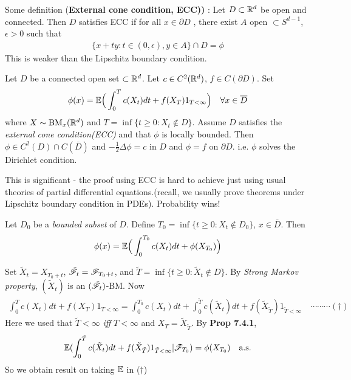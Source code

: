 \documentclass[12pt,a4paper]{report}
\newenvironment{proof}
{\begin{changemargin}{1cm}{0.5cm} 
	}%
	{\end{changemargin}
}
\begin{document}
Some definition (\textbf{External cone condition, ECC))} : Let $D \subset \mathbb{R}^d$ be open and connected. Then $D$ satisfies ECC if for all $x\in \partial D$ , there exist $A$ open $\subset S^{d-1}$, $\epsilon >0$ such that
\begin{align*}
\{x+ty : t\in (0,\epsilon), y\in A \} \cap D = \phi
\end{align*}
This is weaker than the Lipschitz boundary condition.

\s
{} Let $D$ be a connected open set $\subset \mathbb{R}^d$. Let $c\in C^2(\mathbb{R}^d)$, $f\in C(\partial D)$. Set
\begin{align*}
\phi(x) = \mathbb{E} \Big( \int_0^T c(X_t) dt + f(X_T) 1_{T<\infty} \Big) \quad \forall x\in \overline{D}
\end{align*}
where $X \sim \text{BM}_x(\mathbb{R}^d)$ and $T = \inf \{ t\geq 0: X_t \not\in D \}$. Assume $D$ satisfies the \emph{external cone condition(ECC)} and that $\phi$ is locally bounded. Then $\phi \in C^2(D) \cap C(\overline{D})$ and $-\frac{1}{2}\Delta \phi =c$ in $D$ and $\phi =f$ on $\partial D$. i.e. $\phi$ solves the Dirichlet condition.
\s

This is significant - the proof using ECC is hard to achieve just using usual theories of partial differential equations.(recall, we usually prove theorems under Lipschitz boundary condition in PDEs). Probability wins!
\s

 Let $D_0$ be a \emph{bounded subset} of $D$. Define $T_0 = \inf \{t\geq 0: X_t \not\in D_0 \}$, $x\in \overline{D}$. Then
\begin{align*}
\phi(x) = \mathbb{E} \Big( \int_0^{T_0} c(X_t) dt + \phi(X_{T_{0}}) \Big)
\end{align*}
\begin{proof}
\pf Set $\tilde{X}_t = X_{T_0 +t}$, $\tilde{\mathscr{F}}_{t} = \mathscr{F}_{T_0 +t}$, and $\tilde{T} = \inf \{ t\geq 0 : \tilde{X}_t \not\in D \}$. By \emph{Strong Markov property}, $(\tilde{X}_t)$ is an $(\tilde{\mathscr{F}}_t)$-BM. Now
\begin{align*}
\int_0^T c(X_t) dt + f(X_T) 1_{T<\infty} = \int_0^{T_0} c(X_t) dt + \int_0^{\tilde{T}} c(\tilde{X}_t) dt + f(\tilde{X}_{\tilde{T}})1_{\tilde{T}<\infty} \quad \cdots\cdots\cdots (\dagger)
\end{align*}
Here we used that $\tilde{T}<\infty$ \emph{iff} $T<\infty$ and $X_T = \tilde{X}_{\tilde{T}}$. By \textbf{Prop 7.4.1},
\begin{align*}
\mathbb{E}( \int_0^{\tilde{T}} c(\tilde{X}_t) dt + f(\tilde{X}_{\tilde{T}})1_{\tilde{T}<\infty} | \mathscr{F}_{T_0} ) = \phi(X_{T_0}) \quad \text{a.s.}
\end{align*}
So we obtain result on taking $\mathbb{E}$ in ($\dagger$)

\eop
\end{proof}
\s
\end{document}
